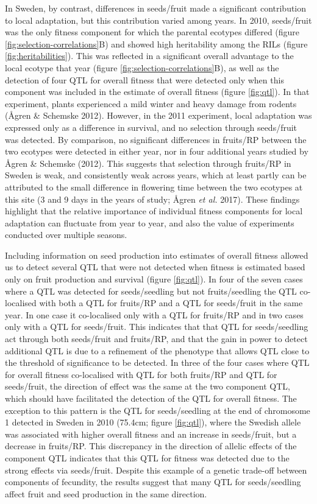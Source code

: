 \documentclass[]{article}
\begin{document}
In Sweden, by contrast, differences in seeds/fruit made a significant contribution to local adaptation, but this contribution varied among years. In 2010, seeds/fruit was the only fitness component for which the parental ecotypes differed (figure \ref{fig:selection-correlations}B) and showed high heritability among the RILs (figure \ref{fig:heritabilities}). This was reflected in a significant overall advantage to the local ecotype that year (figure \ref{fig:selection-correlations}B), as well as the detection of four QTL for overall fitness that were detected only when this component was included in the estimate of overall fitness (figure \ref{fig:qtl}). In that experiment, plants experienced a mild winter and heavy damage from rodents (Ågren \& Schemske 2012). However, in the 2011 experiment, local adaptation was expressed only as a difference in survival, and no selection through seeds/fruit was detected. By comparison, no significant differences in fruits/RP between the two ecotypes were detected in either year, nor in four additional years studied by Ågren \& Schemske (2012). This suggests that selection through fruits/RP in Sweden is weak, and consistently weak across years, which at least partly can be attributed to the small difference in flowering time between the two ecotypes at this site (3 and 9 days in the years of study; Ågren \emph{et al.} 2017). These findings highlight that the relative importance of individual fitness components for local adaptation can fluctuate from year to year, and also the value of experiments conducted over multiple seasons.

Including information on seed production into estimates of overall fitness allowed us to detect several QTL that were not detected when fitness is estimated based only on fruit production and survival (figure \ref{fig:qtl}). In four of the seven cases where a QTL was detected for seeds/seedling but not fruits/seedling the QTL co-localised with both a QTL for fruits/RP and a QTL for seeds/fruit in the same year. In one case it co-localised only with a QTL for fruits/RP and in two cases only with a QTL for seeds/fruit. This indicates that that QTL for seeds/seedling act through both seeds/fruit and fruits/RP, and that the gain in power to detect additional QTL is due to a refinement of the phenotype that allows QTL close to the threshold of significance to be detected. In three of the four cases where QTL for overall fitness co-localised with QTL for both fruits/RP and QTL for seeds/fruit, the direction of effect was the same at the two component QTL, which should have facilitated the detection of the QTL for overall fitness. The exception to this pattern is the QTL for seeds/seedling at the end of chromosome 1 detected in Sweden in 2010 (75.4cm; figure \ref{fig:qtl}), where the Swedish allele was associated with higher overall fitness and an increase in seeds/fruit, but a decrease in fruits/RP. This discrepancy in the direction of allelic effects of the component QTL indicates that this QTL for fitness was detected due to the strong effects via seeds/fruit. Despite this example of a genetic trade-off between components of fecundity, the results suggest that many QTL for seeds/seedling affect fruit and seed production in the same direction.
\end{document}
